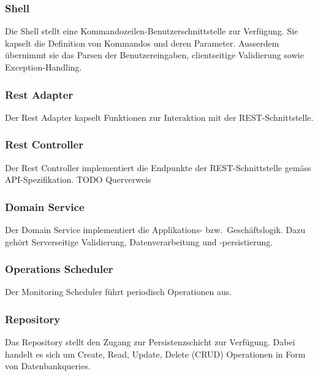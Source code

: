 \documentclass[a4paper,12pt]{report}
\begin{document}
    \newpage

    \subsubsection{Shell}\label{subsubsec:shell}
    Die Shell stellt eine Kommandozeilen-Benutzerschnittstelle zur Verfügung.
    Sie kapselt die Definition von Kommandos und deren Parameter.
    Ausserdem übernimmt sie das Parsen der Benutzereingaben, clientseitige Validierung sowie Exception-Handling.

    \subsubsection{Rest Adapter}\label{subsubsec:rest-adapter}
    Der Rest Adapter kapselt Funktionen zur Interaktion mit der REST-Schnittstelle.

    \subsubsection{Rest Controller}
    Der Rest Controller implementiert die Endpunkte der REST-Schnittstelle gemäss API-Spezifikation. TODO Querverweis

    \subsubsection{Domain Service}
    Der Domain Service implementiert die Applikations- bzw.\ Geschäftslogik.
    Dazu gehört Serverseitige Validierung, Datenverarbeitung und -persistierung.

    \subsubsection{Operations Scheduler}
    Der Monitoring Scheduler führt periodisch Operationen aus.

    \subsubsection{Repository}
    Das Repository stellt den Zugang zur Persistenzschicht zur Verfügung.
    Dabei handelt es sich um Create, Read, Update, Delete (CRUD) Operationen in Form von Datenbankqueries.
\end{document}
